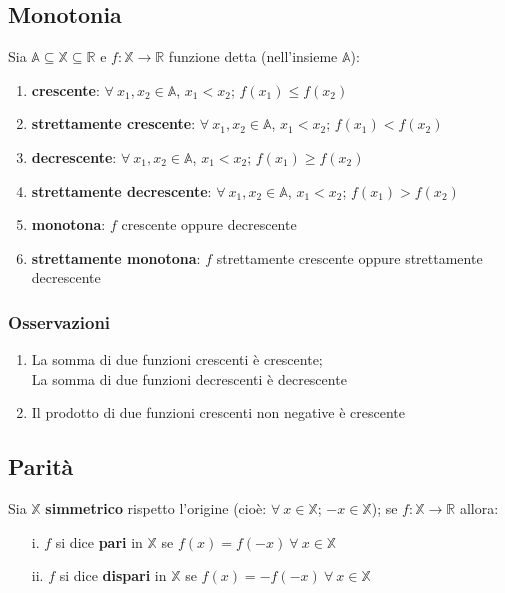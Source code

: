 \subsection{Monotonia}
Sia $\mathbb{A} \subseteq \mathbb{X} \subseteq \mathbb{R}$ e $f: \mathbb{X} \rightarrow \mathbb{R}$ funzione detta (nell'insieme $\mathbb{A}$):
\begin{enumerate}
\item \textbf{crescente}: $\forall\ x_1,x_2 \in \mathbb{A}$, $x_1<x_2$; $f(x_1) \leq f(x_2)$
\item \textbf{strettamente crescente}: $\forall\ x_1,x_2 \in \mathbb{A}$, $x_1<x_2$; $f(x_1) < f(x_2)$
\item \textbf{decrescente}: $\forall\ x_1,x_2 \in \mathbb{A}$, $x_1<x_2$; $f(x_1) \geq f(x_2)$
\item \textbf{strettamente decrescente}: $\forall\ x_1,x_2 \in \mathbb{A}$, $x_1<x_2$; $f(x_1) > f(x_2)$
\item \textbf{monotona}: $f$ crescente oppure decrescente
\item \textbf{strettamente monotona}: $f$ strettamente crescente oppure strettamente decrescente
\end{enumerate}
\subsubsection{Osservazioni}
\begin{enumerate}
\item La somma di due funzioni crescenti è crescente;\\
La somma di due funzioni decrescenti è decrescente
\item Il prodotto di due funzioni crescenti non negative è crescente
\end{enumerate}

\subsection{Parità}
Sia $\mathbb{X}$ \textbf{simmetrico} rispetto l'origine (cioè: $\forall\ x \in \mathbb{X}$; $-x \in \mathbb{X}$); se $f: \mathbb{X} \rightarrow \mathbb{R}$ allora:
\begin{enumerate}
\item[i.] $f$ si dice \textbf{pari} in $\mathbb{X}$ se $f(x) = f(-x)\ \forall\ x \in \mathbb{X}$
\item[ii.] $f$ si dice \textbf{dispari} in $\mathbb{X}$ se $f(x) = -f(-x)\ \forall\ x \in \mathbb{X}$
\end{enumerate}

